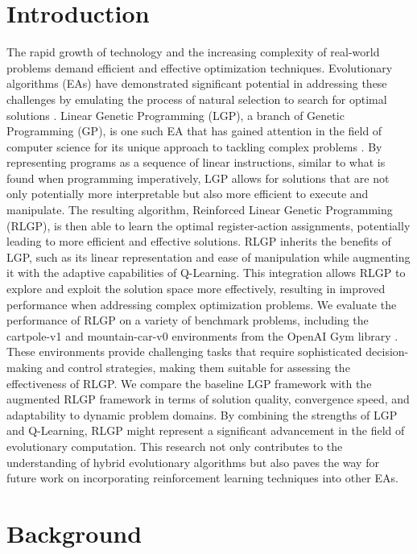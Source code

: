 \documentclass[12pt]{report}
\newcommand{\mainmatter}{}
\begin{document}
\mainmatter

\chapter{Introduction}
The rapid growth of technology and the increasing complexity of real-world problems demand efficient and effective optimization techniques. Evolutionary algorithms (EAs) have demonstrated significant potential in addressing these challenges by emulating the process of natural selection to search for optimal solutions \cite{poli08}. Linear Genetic Programming (LGP), a branch of Genetic Programming (GP), is one such EA that has gained attention in the field of computer science for its unique approach to tackling complex problems \cite{song03}. By representing programs as a sequence of linear instructions, similar to what is found when programming imperatively, LGP allows for solutions that are not only potentially more interpretable but also more efficient to execute and manipulate.
The resulting algorithm, Reinforced Linear Genetic Programming (RLGP), is then able to learn the optimal register-action assignments, potentially leading to more efficient and effective solutions. RLGP inherits the benefits of LGP, such as its linear representation and ease of manipulation while augmenting it with the adaptive capabilities of Q-Learning. This integration allows RLGP to explore and exploit the solution space more effectively, resulting in improved performance when addressing complex optimization problems.
We evaluate the performance of RLGP on a variety of benchmark problems, including the cartpole-v1 and mountain-car-v0 environments from the OpenAI Gym library \cite{1606.01540}. These environments provide challenging tasks that require sophisticated decision-making and control strategies, making them suitable for assessing the effectiveness of RLGP. We compare the baseline LGP framework with the augmented RLGP framework in terms of solution quality, convergence speed, and adaptability to dynamic problem domains.
By combining the strengths of LGP and Q-Learning, RLGP might represent a significant advancement in the field of evolutionary computation. This research not only contributes to the understanding of hybrid evolutionary algorithms but also paves the way for future work on incorporating reinforcement learning techniques into other EAs.

\chapter{Background}
\end{document}
